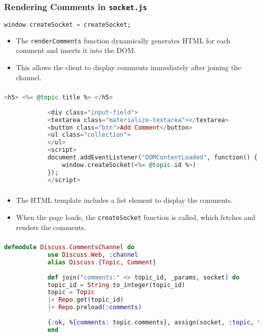 \documentclass[aspectratio=169, table]{beamer}
\begin{document}
	\begin{frame}[fragile]
		\frametitle{Rendering Comments in \texttt{socket.js}}
		\begin{lstlisting}[language=Elixir]
			window.createSocket = createSocket;
		\end{lstlisting}
		\begin{itemize}
			\item The \texttt{renderComments} function dynamically generates HTML for each comment and inserts it into the DOM.
			\item This allows the client to display comments immediately after joining the channel.
		\end{itemize}
	\end{frame}
	
	\begin{frame}[fragile]
		\frametitle{}
		\begin{lstlisting}[language=Elixir]
			<h5> <%= @topic.title %> </h5>
			
			<div class="input-field">
			<textarea class="materialize-textarea"></textarea>
			<button class="btn">Add Comment</button>
			<ul class="collection">
			</ul>
			<script>
			document.addEventListener("DOMContentLoaded", function() {
				window.createSocket(<%= @topic.id %>)
			}); 
			</script>
		\end{lstlisting}
	\end{frame}
	
	\begin{frame}[fragile]
		\frametitle{}
		\begin{itemize}
			\item The HTML template includes a list element to display the comments.
			\item When the page loads, the \texttt{createSocket} function is called, which fetches and renders the comments.
		\end{itemize}
	\end{frame}
	
	\begin{frame}[fragile]
		\frametitle{}
		\begin{lstlisting}[language=Elixir]
			defmodule Discuss.CommentsChannel do 
			use Discuss.Web, :channel
			alias Discuss.{Topic, Comment}
			
			def join("comments:" <> topic_id, _params, socket) do
			topic_id = String.to_integer(topic_id)
			topic = Topic 
			|> Repo.get(topic_id)
			|> Repo.preload(:comments)
			
			{:ok, %{comments: topic.comments}, assign(socket, :topic, topic)}
			end
		\end{lstlisting}
	\end{frame}
	
\end{document}
